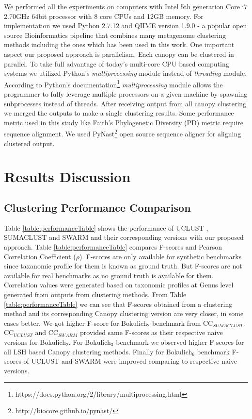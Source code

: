 \documentclass[10pt, conference, compsocconf]{IEEEtran}
\begin{document}
We performed all the experiments on computers with Intel 5th generation Core i7 2.70GHz 64bit processor with 8 core CPUs and 12GB memory. For implementation we used Python 2.7.12 and QIIME \cite{MARQiime} version 1.9.0 - a popular open source Bioinformatics pipeline that combines many metagenome clustering methods including the ones which has been used in this work. One important aspect our proposed approach is parallelism. Each canopy can be clustered in parallel. To take full advantage of today's multi-core CPU based computing systems we utilized Python's \textit{multiprocessing} module instead of \textit{threading} module. According to Python's documentation\footnote{https://docs.python.org/2/library/multiprocessing.html} \textit{multiprocessing} module allows the programmer to fully leverage multiple processors on a given machine by spawning subprocesses instead of threads. After receiving output from all canopy clustering we merged the outputs to make a single clustering results. Some performance metric used in this study like Faith’s Phylogenetic Diversity (PD) metric require sequence alignment. We used PyNast\footnote{http://biocore.github.io/pynast/} \cite{MARPynast} open source sequence aligner for aligning clustered output.    


\section{Results Discussion} 
\label{sec:results}

\subsection{\textbf{Clustering Performance Comparison}}
Table \ref{table:performanceTable} shows the performance of  UCLUST \cite{MARuclust}, 
SUMACLUST \cite{MARSumaclust} and SWARM \cite{MARSwarm} and their corresponding versions with our proposed approach. Table \ref{table:performanceTable} compares F-scores and Pearson Correlation Coefficient ($\rho$). F-scores are only available for synthetic benchmarks since taxanomic profile for them is known as ground truth. But F-scores are not available for real benchmarks as no ground truth is available for them. Correlation values were generated based on taxonomic profiles at Genus level generated from outputs from clustering methods. From Table \ref{table:performanceTable} we can see that F-scores obtained from a clustering method and its corresponding Canopy clustering version are very closer, in some cases better. We got higher F-score for Bokulich$_2$ benchmark from CC$_{SUMACLUST}$. CC$_{UCLUST}$ and CC$_{SWARM}$ provided same F-scores as their respective naive versions for Bokulich$_2$. For Bokulich$_3$ benchmark we observed higher F-scores for all LSH based Canopy clustering methods. Finally for Bokulich$_6$ benchmark F-scores of UCLUST and SWARM were improved comparing to respective naive versions.
\end{document}
